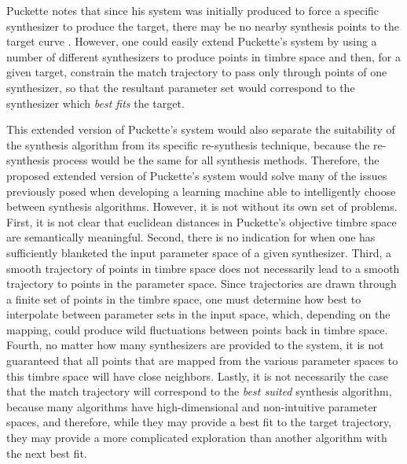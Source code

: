 \documentclass[a4paper,12pt]{report} 	%
\numberwithin{figure}{chapter}
\numberwithin{table}{chapter}
\numberwithin{equation}{chapter}
\begin{document}
\begin{flushleft}
Puckette notes that since his system was initially produced to force a specific synthesizer to produce the target, there may be no nearby synthesis points to the target curve \cite[p. 3]{Puckette:2004zp}. However, one could easily extend Puckette's system by using a number of different synthesizers to produce points in timbre space and then, for a given target, constrain the match trajectory to pass only through points of one synthesizer, so that the resultant parameter set would correspond to the synthesizer which \emph{best fits} the target. 

This extended version of Puckette's system would also separate the suitability of the synthesis algorithm from its specific re-synthesis technique, because the re-synthesis process would be the same for all synthesis methods. Therefore, the proposed extended version of Puckette's system would solve many of the issues previously posed when developing a learning machine able to intelligently choose between synthesis algorithms. However, it is not without its own set of problems. First, it is not clear that euclidean distances in Puckette's objective timbre space are semantically meaningful. Second, there is no indication for when one has sufficiently blanketed the input parameter space of a given synthesizer. Third, a smooth trajectory of points in timbre space does not necessarily lead to a smooth trajectory to points in the parameter space. Since trajectories are drawn through a finite set of points in the timbre space, one must determine how best to interpolate between parameter sets in the input space, which, depending on the mapping, could produce wild fluctuations between points back in timbre space. Fourth, no matter how many synthesizers are provided to the system, it is not guaranteed that all points that are mapped from the various parameter spaces to this timbre space will have close neighbors. Lastly, it is not necessarily the case that the match trajectory will correspond to the \emph{best suited} synthesis algorithm, because many algorithms have high-dimensional and non-intuitive parameter spaces, and therefore, while they may provide a best fit to the target trajectory, they may provide a more complicated exploration than another algorithm with the next best fit.
\\
\begin{figure}[h!]
\begin{center}

\end{center}
\end{figure}
\end{flushleft}
\end{document}
